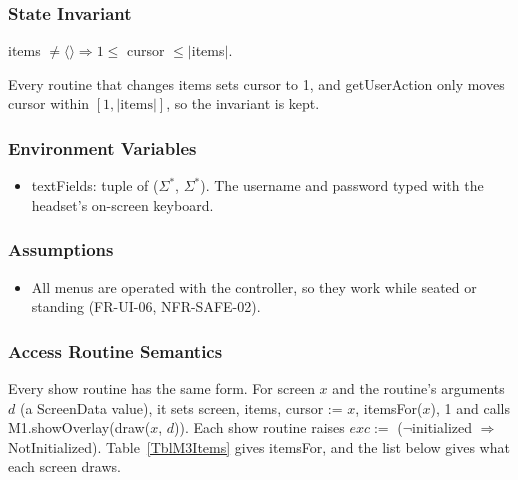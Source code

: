 \documentclass[12pt, titlepage]{article}
\newcommand{\noinit}{$\neg$initialized $\Rightarrow$ NotInitialized}
\begin{document}
\subsubsection{State Invariant}

items $\neq \langle\rangle \Rightarrow 1 \leq$ cursor $\leq |$items$|$.

Every routine that changes items sets cursor to 1, and getUserAction only
moves cursor within $[1, |\text{items}|]$, so the invariant is kept.

\subsubsection{Environment Variables}

\begin{itemize}
\item textFields: tuple of ($\Sigma^*$, $\Sigma^*$). The username and password
  typed with the headset's on-screen keyboard.
\end{itemize}

\subsubsection{Assumptions}

\begin{itemize}
\item All menus are operated with the controller, so they work while seated or
  standing (FR-UI-06, NFR-SAFE-02).
\end{itemize}

\subsubsection{Access Routine Semantics}

Every show routine has the same form. For screen $x$ and the routine's
arguments $d$ (a ScreenData value), it sets screen, items, cursor := $x$,
itemsFor($x$), 1 and calls M1.showOverlay(draw($x$, $d$)). Each show routine
raises $exc :=$ (\noinit).
Table~\ref{TblM3Items} gives itemsFor, and the list below gives what each
screen draws.
\end{document}
